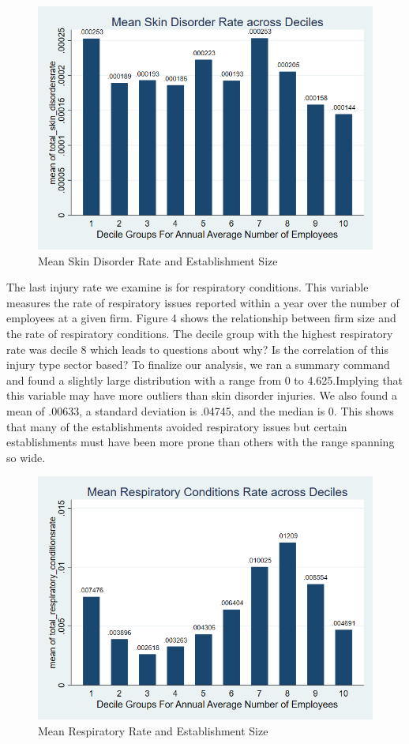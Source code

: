 \documentclass[12pt]{article}
\begin{document}
\begin{figure}
    \centering
    \includegraphics[width=0.7\linewidth]{SkinDecileBar (1).png}
    \caption{Mean Skin Disorder Rate and Establishment Size}
    \label{Figure 3:}
\end{figure}

The last injury rate we examine is for respiratory conditions. This variable measures the rate of respiratory issues reported within a year over the number of employees at a given firm. Figure 4 shows the relationship between firm size and the rate of respiratory conditions. The decile group with the highest respiratory rate was decile 8 which leads to questions about why? Is the correlation of this injury type sector based? To finalize our analysis, we ran a summary command and found a slightly large distribution with a range from 0 to 4.625.Implying that this variable may have more outliers than skin disorder injuries. We also found a mean of .00633, a standard deviation is .04745, and the median is 0. This shows that many of the establishments avoided respiratory issues but certain establishments must have been more prone than others with the range spanning so wide. 

\begin{figure}
    \centering
    \includegraphics[width=0.7\linewidth]{RespiratoryDecileBar (1).png}
    \caption{Mean Respiratory Rate and Establishment Size}
    \label{Figure 4:}
\end{figure}
\end{document}
